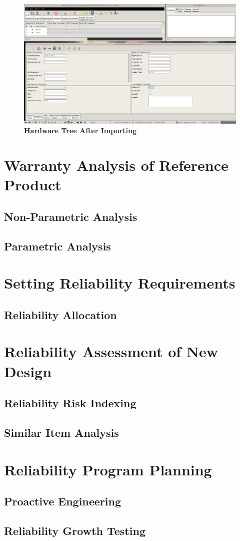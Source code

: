 \documentclass[11pt, 12pt, twoside, onecolumn]{book}
\begin{document}
\begin{landscape}
	\begin{figure}[htbp]
		\centering
		\includegraphics[width=18cm]{./figures/new_project_import_bom_3}
		\caption{\textbf{Hardware Tree After Importing}}
		\label{fig:new_project_hardware_after_import}
	\end{figure}
\end{landscape}


\chapter{Warranty Analysis of Reference Product}
\section{Non-Parametric Analysis}
\section{Parametric Analysis}

\chapter{Setting Reliability Requirements}
\section{Reliability Allocation}

\chapter{Reliability Assessment of New Design}
\section{Reliability Risk Indexing}
\section{Similar Item Analysis}

\chapter{Reliability Program Planning}
\section{Proactive Engineering}
\section{Reliability Growth Testing}
\end{document}
